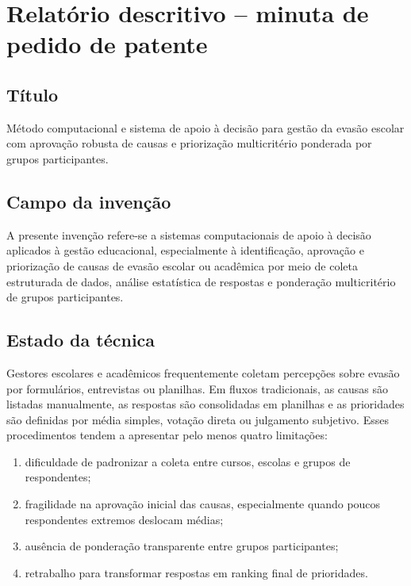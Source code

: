 \section{Relatório descritivo -- minuta de pedido de patente}

\subsection{Título}

Método computacional e sistema de apoio à decisão para gestão da evasão escolar com aprovação robusta de causas e priorização multicritério ponderada por grupos participantes.

\subsection{Campo da invenção}

A presente invenção refere-se a sistemas computacionais de apoio à decisão aplicados à gestão educacional, especialmente à identificação, aprovação e priorização de causas de evasão escolar ou acadêmica por meio de coleta estruturada de dados, análise estatística de respostas e ponderação multicritério de grupos participantes.

\subsection{Estado da técnica}

Gestores escolares e acadêmicos frequentemente coletam percepções sobre evasão por formulários, entrevistas ou planilhas. Em fluxos tradicionais, as causas são listadas manualmente, as respostas são consolidadas em planilhas e as prioridades são definidas por média simples, votação direta ou julgamento subjetivo. Esses procedimentos tendem a apresentar pelo menos quatro limitações:

\begin{enumerate}
  \item dificuldade de padronizar a coleta entre cursos, escolas e grupos de respondentes;
  \item fragilidade na aprovação inicial das causas, especialmente quando poucos respondentes extremos deslocam médias;
  \item ausência de ponderação transparente entre grupos participantes;
  \item retrabalho para transformar respostas em ranking final de prioridades.
\end{enumerate}

